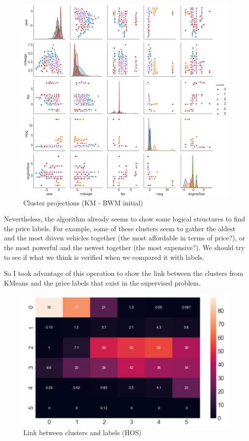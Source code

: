 \documentclass[15pt]{article}
\begin{document}
\begin{multicols}{2}
\begin{figure}[H]
\centering
\includegraphics[width = \columnwidth]{pplotBMWkm.png}
\caption{Cluster projections (KM - BWM initial)}
\end{figure}

Nevertheless, the algorithm already seems to show some logical structures to find the price labels. For example, some of these clusters seem to gather the oldest and the most driven vehicles together (the most affordable in terms of price?), or the most powerful and the newest together (the most expensive?). We should try to see if what we think is verified when we compared it with labels.

So I took advantage of this operation to show the link between the clusters from KMeans and the price labels that exist in the supervised problem.

\begin{figure}[H]
\centering
\includegraphics[width = \columnwidth]{grBMWkm.png}
\caption{Link between clusters and labels (HOS)}
\end{figure}


\end{multicols}
\end{document}
